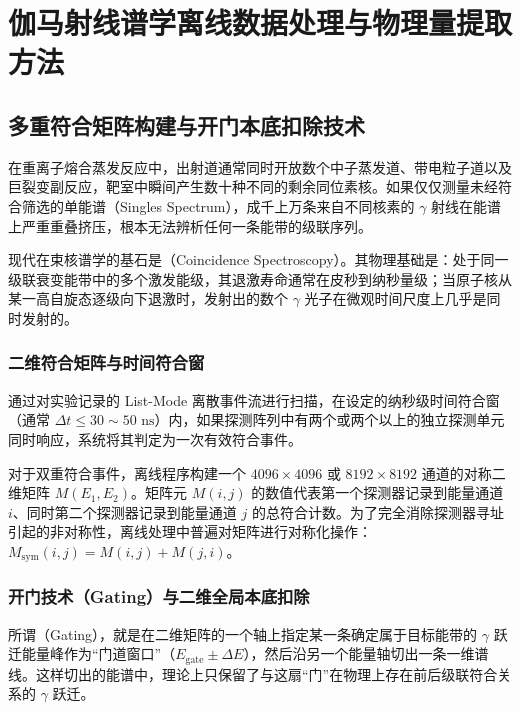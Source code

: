 
\chapter{伽马射线谱学离线数据处理与物理量提取方法}
\label{ch:data_analysis_methods}

\section{多重符合矩阵构建与开门本底扣除技术}
\label{sec:coincidence_matrix}

在重离子熔合蒸发反应中，出射道通常同时开放数个中子蒸发道、带电粒子道以及巨裂变副反应，靶室中瞬间产生数十种不同的剩余同位素核。如果仅仅测量未经符合筛选的单能谱（Singles Spectrum），成千上万条来自不同核素的 $\gamma$ 射线在能谱上严重重叠挤压，根本无法辨析任何一条能带的级联序列。

现代在束核谱学的基石是（Coincidence Spectroscopy）。其物理基础是：处于同一级联衰变能带中的多个激发能级，其退激寿命通常在皮秒到纳秒量级；当原子核从某一高自旋态逐级向下退激时，发射出的数个 $\gamma$ 光子在微观时间尺度上几乎是同时发射的。

\subsection{二维符合矩阵与时间符合窗}

通过对实验记录的 List-Mode 离散事件流进行扫描，在设定的纳秒级时间符合窗（通常 $\Delta t \le 30 \sim 50\text{ ns}$）内，如果探测阵列中有两个或两个以上的独立探测单元同时响应，系统将其判定为一次有效符合事件。

对于双重符合事件，离线程序构建一个 $4096 \times 4096$ 或 $8192 \times 8192$ 通道的对称二维矩阵 $M(E_1, E_2)$。矩阵元 $M(i, j)$ 的数值代表第一个探测器记录到能量通道 $i$、同时第二个探测器记录到能量通道 $j$ 的总符合计数。为了完全消除探测器寻址引起的非对称性，离线处理中普遍对矩阵进行对称化操作：$M_{\text{sym}}(i, j) = M(i, j) + M(j, i)$。

\subsection{开门技术（Gating）与二维全局本底扣除}

所谓（Gating），就是在二维矩阵的一个轴上指定某一条确定属于目标能带的 $\gamma$ 跃迁能量峰作为“门道窗口”（$E_{\text{gate}} \pm \Delta E$），然后沿另一个能量轴切出一条一维谱线。这样切出的能谱中，理论上只保留了与这扇“门”在物理上存在前后级联符合关系的 $\gamma$ 跃迁。

